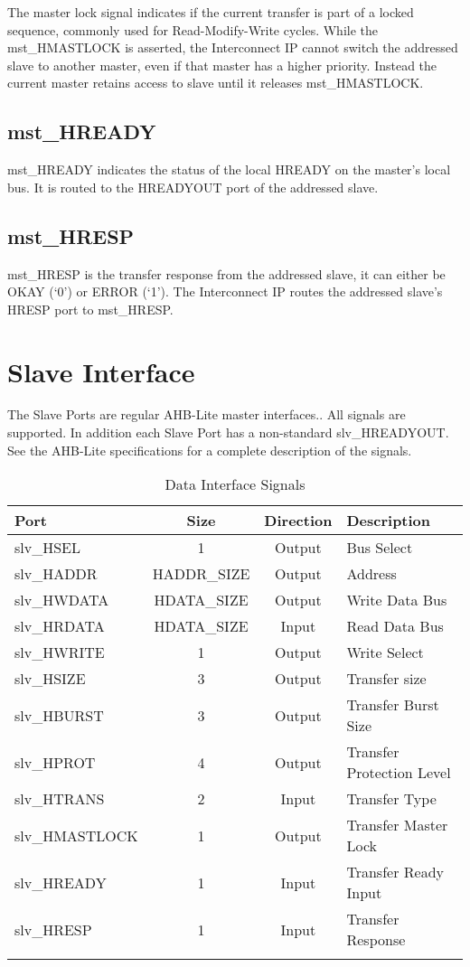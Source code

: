 The master lock signal indicates if the current transfer is part of a
locked sequence, commonly used for Read-Modify-Write cycles. While the
mst\_HMASTLOCK is asserted, the Interconnect IP cannot switch the
addressed slave to another master, even if that master has a higher
priority. Instead the current master retains access to slave until it
releases mst\_HMASTLOCK.

\subsection{mst\_HREADY}\label{mst_hready}

mst\_HREADY indicates the status of the local HREADY on the master's
local bus. It is routed to the HREADYOUT port of the addressed slave.

\subsection{mst\_HRESP}\label{mst_hresp}

mst\_HRESP is the transfer response from the addressed slave, it can
either be OKAY (`0') or ERROR (`1'). The Interconnect IP routes the
addressed slave's HRESP port to mst\_HRESP.

\section{Slave Interface}\label{slave-interface}

The Slave Ports are regular AHB-Lite master interfaces.. All signals are
supported. In addition each Slave Port has a non-standard
slv\_HREADYOUT. See the AHB-Lite specifications for a complete
description of the signals.

\begin{longtable}[]{@{}lccl@{}}
\toprule
Port & Size & Direction & Description\tabularnewline
\midrule
\endhead
slv\_HSEL & 1 & Output & Bus Select\tabularnewline
slv\_HADDR & HADDR\_SIZE & Output & Address\tabularnewline
slv\_HWDATA & HDATA\_SIZE & Output & Write Data Bus\tabularnewline
slv\_HRDATA & HDATA\_SIZE & Input & Read Data Bus\tabularnewline
slv\_HWRITE & 1 & Output & Write Select\tabularnewline
slv\_HSIZE & 3 & Output & Transfer size\tabularnewline
slv\_HBURST & 3 & Output & Transfer Burst Size\tabularnewline
slv\_HPROT & 4 & Output & Transfer Protection Level\tabularnewline
slv\_HTRANS & 2 & Input & Transfer Type\tabularnewline
slv\_HMASTLOCK & 1 & Output & Transfer Master Lock\tabularnewline
slv\_HREADY & 1 & Input & Transfer Ready Input\tabularnewline
slv\_HRESP & 1 & Input & Transfer Response\tabularnewline
\bottomrule
\caption{Data Interface Signals}
\end{longtable}

